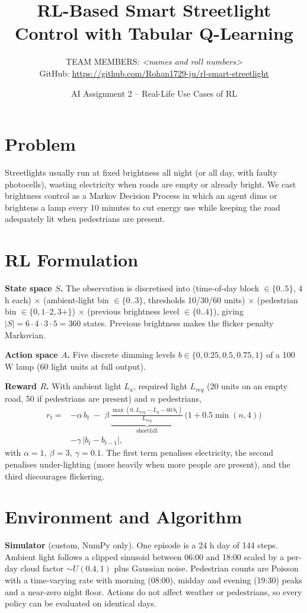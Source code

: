 \documentclass[10pt,twocolumn,a4paper]{article}
\title{\vspace{-1.5cm}\textbf{RL-Based Smart Streetlight Control with Tabular Q-Learning}\vspace{-0.3cm}}
\author{\small TEAM MEMBERS: \textit{<names and roll numbers>}\\
\small GitHub: \url{https://github.com/Rohan1729-ju/rl-smart-streetlight}}
\date{\vspace{-0.6cm}AI Assignment 2 -- Real-Life Use Cases of RL}
\begin{document}
\maketitle
\vspace{-0.4cm}

\section{Problem}
Streetlights usually run at fixed brightness all night (or all day, with faulty photocells), wasting electricity when roads are empty or already bright. We cast brightness control as a Markov Decision Process in which an agent dims or brightens a lamp every 10 minutes to cut energy use while keeping the road adequately lit when pedestrians are present.

\section{RL Formulation}
\textbf{State space $S$.} The observation is discretised into
(time-of-day block $\in\{0..5\}$, 4 h each) $\times$ (ambient-light bin $\in\{0..3\}$, thresholds 10/30/60 units) $\times$ (pedestrian bin $\in\{0,1\text{--}2,3+\}$) $\times$ (previous brightness level $\in\{0..4\}$), giving $|S|=6\cdot4\cdot3\cdot5=360$ states. Previous brightness makes the flicker penalty Markovian.

\textbf{Action space $A$.} Five discrete dimming levels $b\in\{0,0.25,0.5,0.75,1\}$ of a 100\,W lamp (60 light units at full output).

\textbf{Reward $R$.} With ambient light $L_a$, required light $L_{req}$ (20 units on an empty road, 50 if pedestrians are present) and $n$ pedestrians,
\begin{equation}
\begin{split}
r_t = &-\alpha\, b_t \;-\; \beta\, \underbrace{\frac{\max(0,L_{req}-L_a-60\,b_t)}{L_{req}}}_{\text{shortfall}}\,\bigl(1+0.5\min(n,4)\bigr)\\
&-\gamma\,|b_t-b_{t-1}|,
\end{split}
\end{equation}
with $\alpha=1,\ \beta=3,\ \gamma=0.1$. The first term penalises electricity, the second penalises under-lighting (more heavily when more people are present), and the third discourages flickering.

\section{Environment and Algorithm}
\textbf{Simulator} (custom, NumPy only). One episode is a 24 h day of 144 steps. Ambient light follows a clipped sinusoid between 06:00 and 18:00 scaled by a per-day cloud factor $\sim U(0.4,1)$ plus Gaussian noise. Pedestrian counts are Poisson with a time-varying rate with morning (08:00), midday and evening (19:30) peaks and a near-zero night floor. Actions do not affect weather or pedestrians, so every policy can be evaluated on identical days.
\end{document}
